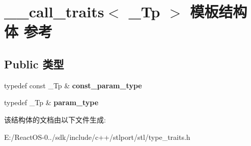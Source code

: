 \hypertarget{struct____call__traits}{}\section{\+\_\+\+\_\+call\+\_\+traits$<$ \+\_\+\+Tp $>$ 模板结构体 参考}
\label{struct____call__traits}
\subsection*{Public 类型}
\begin{DoxyCompactItemize}
\item 
\mbox{\label{struct____call__traits_a40cd7d872083ca60bd4d00955969780c}} 
typedef const \+\_\+\+Tp \& {\bfseries const\+\_\+param\+\_\+type}
\item 
\mbox{\label{struct____call__traits_a242f0d657972d74da70bc49bb35f50a0}} 
typedef \+\_\+\+Tp \& {\bfseries param\+\_\+type}
\end{DoxyCompactItemize}


该结构体的文档由以下文件生成\+:\begin{DoxyCompactItemize}
\item 
E\+:/\+React\+O\+S-\/0../sdk/include/c++/stlport/stl/type\+\_\+traits.\+h\end{DoxyCompactItemize}

